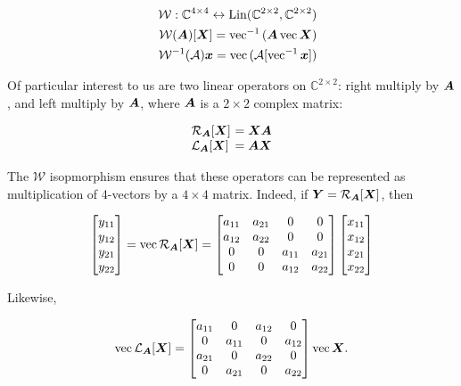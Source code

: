 \documentclass[useAMS,usenatbib]{mn2e}
\newcommand{\COMPLEX}{\mathbb{C}}
\newcommand{\mat}[1]{{\bmath{#1}}}
\begin{document}
\begin{eqnarray}
&& \mathcal{W}:\COMPLEX^{4\times4}\leftrightarrow\mathrm{Lin}(\COMPLEX^{2\times2},\COMPLEX^{2\times2}) \nonumber\\
&& \mathcal{W}(\mat{A})[\mat{X}] = \VECINV{(\mat{A}\,\VEC{\mat{X}})} \nonumber \\
&& \mathcal{W}^{-1}(\mathcal{A})\bmath{x} = \VEC{(\mathcal{A}[ \VECINV{\bmath{x}} ])} \label{eq:iso:W}
\end{eqnarray}

Of particular interest to us are two linear operators on $\COMPLEX^{2\times2}$: right multiply by $\mat{A}$, and left multiply by $\mat{A}$, where $\mat{A}$ is a $2\times2$ complex matrix:

\[
\begin{array}{l@{~}l}
\Rop{\mat{A}}[\mat{X}] &= \mat{XA} \\
\Lop{\mat{A}}[\mat{X}] &= \mat{AX} \\
\end{array}
\]

The $\mathcal{W}$ isopmorphism ensures that these operators can be represented as multiplication of 4-vectors 
by a $4\times4$ matrix. Indeed, if $\mat{Y}=\Rop{\mat{A}}[\mat{X}]$, then 

\begin{equation}
\Matrix{c}{y_{11}\\y_{12}\\y_{21}\\y_{22}} = \VEC{\Rop{\mat{A}}[\mat{X}]} = 
\Matrix{cccc}{a_{11}&a_{21}&0&0 \\ a_{12}&a_{22}&0&0 \\ 0&0&a_{11}&a_{21} \\ 0&0&a_{12}&a_{22} }
\Matrix{c}{x_{11}\\x_{12}\\x_{21}\\x_{22}} 
\end{equation}

Likewise, 

\begin{equation}
\VEC{\Lop{\mat{A}}[\mat{X}]} = 
\Matrix{cccc}{a_{11}&0&a_{12}&0 \\ 0&a_{11}&0&a_{12} \\ a_{21}&0&a_{22}&0  \\ 0&a_{21}&0&a_{22} }
\VEC{\mat{X}}.
\end{equation}

\end{document}
